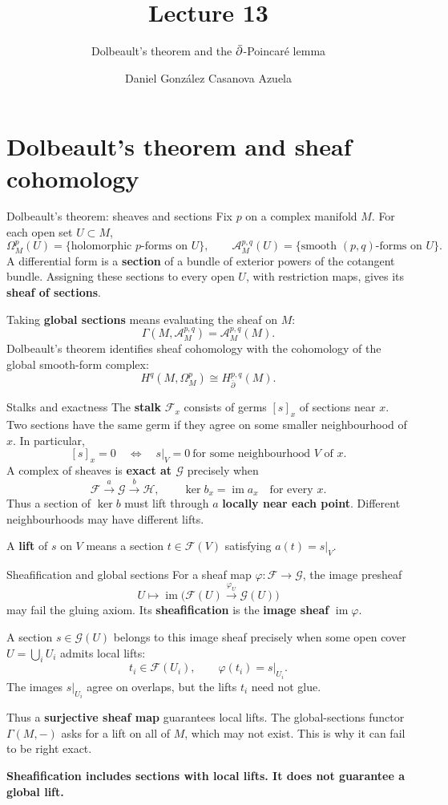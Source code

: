 \documentclass[aspectratio=169,11pt]{beamer}
\title{Lecture 13}
\subtitle{Dolbeault's theorem and the $\db$-Poincar\'e lemma}
\author{Daniel Gonz\'alez Casanova Azuela}
\date{}
\newcommand{\db}{\bar\partial}
\newcommand{\A}{\mathcal A}
\newcommand{\F}{\mathcal F}
\begin{document}
\begin{frame}
\titlepage
\end{frame}

\section{Dolbeault's theorem and sheaf cohomology}
\begin{frame}{Dolbeault's theorem: sheaves and sections}
Fix $p$ on a complex manifold $M$. For each open set $U\subset M$,
\[
 \Omega^p_M(U)=\{\text{holomorphic }p\text{-forms on }U\},\qquad
 \A^{p,q}_M(U)=\{\text{smooth }(p,q)\text{-forms on }U\}.
\]
A differential form is a \textbf{section} of a bundle of exterior powers
of the cotangent bundle. Assigning these sections to every open $U$,
with restriction maps, gives its \textbf{sheaf of sections}.

Taking \textbf{global sections} means evaluating the sheaf on $M$:
\[
 \Gamma(M,\A^{p,q}_M)=\A^{p,q}_M(M).
\]
Dolbeault's theorem identifies sheaf cohomology with the cohomology
of the global smooth-form complex:
\[
 \boxed{H^q(M,\Omega^p_M)\cong H^{p,q}_{\db}(M).}
\]
\end{frame}

\begin{frame}{Stalks and exactness}
The \textbf{stalk} $\F_x$ consists of germs $[s]_x$ of sections near $x$.
Two sections have the same germ if they agree on some smaller
neighbourhood of $x$. In particular,
\[
 [s]_x=0
 \quad\Longleftrightarrow\quad
 s|_V=0\ \text{for some neighbourhood }V\text{ of }x.
\]
A complex of sheaves is \textbf{exact at $\mathcal G$} precisely when
\[
 \F\xrightarrow{a}\mathcal G\xrightarrow{b}\mathcal H,
 \qquad
 \ker b_x=\operatorname{im}a_x\quad\text{for every }x.
\]
Thus a section of $\ker b$ must lift through $a$ \textbf{locally near
each point}. Different neighbourhoods may have different lifts.

A \textbf{lift} of $s$ on $V$ means a section $t\in\F(V)$ satisfying
$a(t)=s|_V$.
\end{frame}

\begin{frame}{Sheafification and global sections}
For a sheaf map $\varphi:\F\to\mathcal G$, the image presheaf
\[
 U\longmapsto\operatorname{im}\bigl(\F(U)\xrightarrow{\varphi_U}
 \mathcal G(U)\bigr)
\]
may fail the gluing axiom. Its \textbf{sheafification} is the
\textbf{image sheaf} $\operatorname{im}\varphi$.

A section $s\in\mathcal G(U)$ belongs to this image sheaf precisely
when some open cover $U=\bigcup_i U_i$ admits local lifts:
\[
 t_i\in\F(U_i),\qquad\varphi(t_i)=s|_{U_i}.
\]
The images $s|_{U_i}$ agree on overlaps, but the lifts $t_i$ need not glue.

Thus a \textbf{surjective sheaf map} guarantees local lifts.
The global-sections functor $\Gamma(M,-)$ asks for a lift on all of $M$,
which may not exist. This is why it can fail to be right exact.

\textbf{Sheafification includes sections with local lifts.
It does not guarantee a global lift.}
\end{frame}
\end{document}
